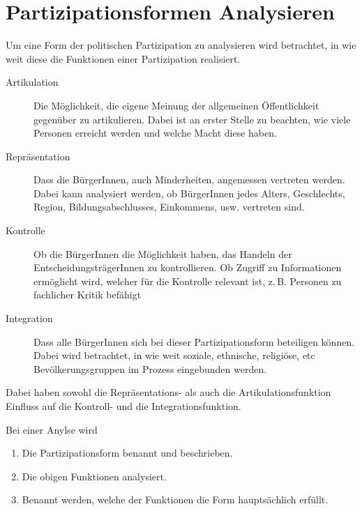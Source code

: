 \documentclass{article}
\begin{document}
\section{Partizipationsformen Analysieren}
Um eine Form der politischen Partizipation zu analysieren wird betrachtet, in wie weit diese die Funktionen einer Partizipation realisiert.
\begin{description}
 \item[Artikulation] Die Möglichkeit, die eigene Meinung der allgemeinen Öffentlichkeit gegenüber zu artikulieren. Dabei ist an erster Stelle zu beachten, wie viele Personen erreicht werden und welche Macht diese haben.
 \item[Repräsentation] Dass die BürgerInnen, auch Minderheiten, angemessen vertreten werden. Dabei kann analysiert werden, ob BürgerInnen jedes Alters, Geschlechts, Region, Bildungsabschlusses, Einkommens, usw. vertreten sind.
 \item[Kontrolle] Ob die BürgerInnen die Möglichkeit haben, das Handeln der EntscheidungsträgerInnen zu kontrollieren. Ob Zugriff zu Informationen ermöglicht wird, welcher für die Kontrolle relevant ist, z.\,B. Personen zu fachlicher Kritik befähigt
 \item[Integration] Dass alle BürgerInnen sich bei dieser Partizipationsform beteiligen können. Dabei wird betrachtet, in wie weit soziale, ethnische, religiöse, etc Bevölkerungsgruppen im Prozess eingebunden werden.
\end{description} 
Dabei haben sowohl die Repräsentations- als auch die Artikulationsfunktion Einfluss auf die Kontroll- und die Integrationsfunktion.
 
Bei einer Anylse wird
\begin{enumerate}
 \item Die Partizipationsform benannt und beschrieben.
 \item Die obigen Funktionen analysiert.
 \item Benannt werden, welche der Funktionen die Form hauptsächlich erfüllt. 
\end{enumerate} 
\end{document}

